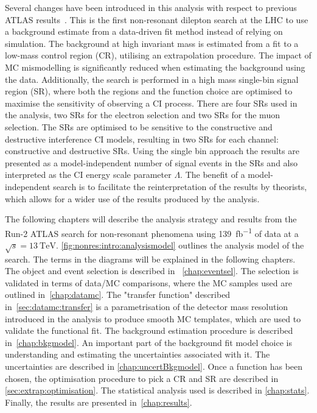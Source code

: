 Several changes have been introduced in this analysis with respect to previous ATLAS results~\cite{EXOT-2016-05}. This is the first non-resonant dilepton search at the LHC to use a background estimate from a data-driven fit method instead of relying on simulation. The background at high invariant mass is estimated from a fit to a low-mass control region (CR), utilising an extrapolation procedure. The impact of MC mismodelling is significantly reduced when estimating the background using the data. Additionally, the search is performed in a high mass single-bin signal region (SR), where both the regions and the function choice are optimised to maximise the sensitivity of observing a CI process. There are four SRs used in the analysis, two SRs for the electron selection and two SRs for the muon selection. The SRs are optimised to be sensitive to the constructive and destructive interference CI models, resulting in two SRs for each channel: constructive and destructive SRs. Using the single bin approach the results are presented as a  model-independent number of signal events in the SRs and also interpreted as the CI energy scale parameter $\Lambda$. The benefit of a model-independent search is to facilitate the reinterpretation of the results by theorists, which allows for a wider use of the results produced by the analysis. 

The following chapters will describe the analysis strategy and results from the Run-2 ATLAS search for non-resonant phenomena using \SI{139}{\femto\barn^{-1}} of data at a $\sqrt{s}=\SI{13}{\tera\electronvolt}$. \cref{fig:nonres:intro:analysismodel} outlines the analysis model of the search. The terms in the diagrams will be explained in the following chapters. The object and event selection is described in ~\cref{chap:eventsel}. The selection is validated in terms of data/MC comparisons, where the MC samples used are outlined in~\cref{chap:datamc}. The "transfer function" described in~\cref{sec:datamc:transfer} is a parametrisation of the detector mass resolution introduced in the analysis to produce smooth MC templates, which are used to validate the functional fit. The background estimation procedure is described in~\cref{chap:bkgmodel}. An important part of the background fit model choice is understanding and estimating the uncertainties associated with it. The uncertainties are described in \cref{chap:uncertBkgmodel}. Once a function has been chosen, the optimisation procedure to pick a CR and SR are described in \cref{sec:extrap:optimisation}. The statistical analysis used is described in \cref{chap:stats}. Finally, the results are presented in~\cref{chap:results}. 

